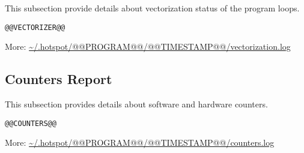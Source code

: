 \documentclass[a4paper]{article}
\begin{document}
This subsection provide details about vectorization status of the program loops.

\begin{verbatim}
@@VECTORIZER@@
\end{verbatim}

More: \url{~/.hotspot/@@PROGRAM@@/@@TIMESTAMP@@/vectorization.log}

\subsection{Counters Report}

This subsection provides details about software and hardware counters.

\begin{verbatim}
@@COUNTERS@@
\end{verbatim}

More: \url{~/.hotspot/@@PROGRAM@@/@@TIMESTAMP@@/counters.log}
\end{document}
